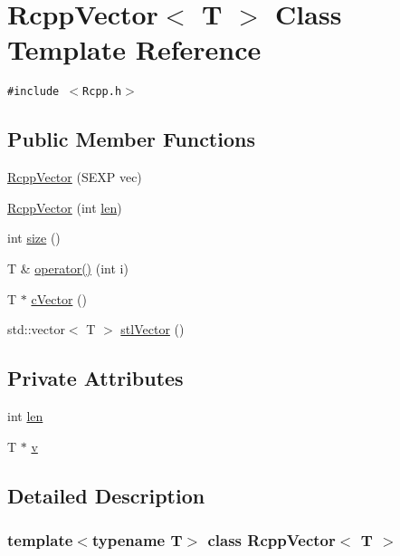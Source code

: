 \hypertarget{classRcppVector}{
\section{RcppVector$<$ T $>$ Class Template Reference}
\label{classRcppVector}
}
{\tt \#include $<$Rcpp.h$>$}

\subsection*{Public Member Functions}
\begin{CompactItemize}
\item 
\hyperlink{classRcppVector_0925b350f636a546e58ad0329786500a}{RcppVector} (SEXP vec)
\item 
\hyperlink{classRcppVector_eb7797ca2b2ac2d03fee0a543993f17b}{RcppVector} (int \hyperlink{classRcppVector_733f5ed23ade0723338904f9f08457d6}{len})
\item 
int \hyperlink{classRcppVector_1e2424dc9b91014ba8b2c9351d97eb37}{size} ()
\item 
T \& \hyperlink{classRcppVector_66aca1da0563af28e55768d98488a42d}{operator()} (int i)
\item 
T $\ast$ \hyperlink{classRcppVector_f4660a27a888a51693b02d2f51b47b08}{cVector} ()
\item 
std::vector$<$ T $>$ \hyperlink{classRcppVector_c650f89b966962b167f3bc42aecf213b}{stlVector} ()
\end{CompactItemize}
\subsection*{Private Attributes}
\begin{CompactItemize}
\item 
int \hyperlink{classRcppVector_733f5ed23ade0723338904f9f08457d6}{len}
\item 
T $\ast$ \hyperlink{classRcppVector_c810c53db4c1b978bada104b38484b26}{v}
\end{CompactItemize}


\subsection{Detailed Description}
\subsubsection*{template$<$typename T$>$ class RcppVector$<$ T $>$}



